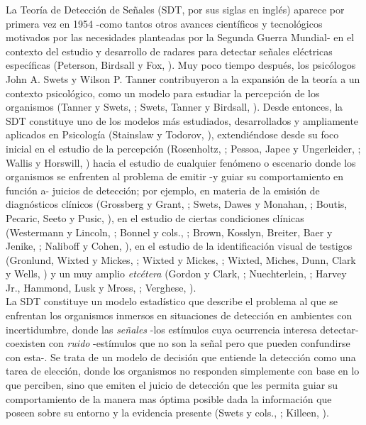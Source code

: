 La Teoría de Detección de Señales (SDT, por sus siglas en inglés) aparece por primera vez en 1954 -como tantos otros avances científicos y tecnológicos motivados por las necesidades planteadas por la Segunda Guerra Mundial- en el contexto del estudio y desarrollo de radares para detectar señales eléctricas específicas (Peterson, Birdsall y Fox, \citeyear{Peterson1954}). Muy poco tiempo después, los psicólogos John A. Swets y Wilson P. Tanner contribuyeron a la expansión de la teoría a un contexto psicológico, como un modelo para estudiar la percepción de los organismos (Tanner y Swets, \citeyear{Tanner1954}; Swets, Tanner y Birdsall, \citeyear{Swets1961}). Desde entonces, la SDT constituye uno de los modelos más estudiados, desarrollados y ampliamente aplicados en Psicología (Stainslaw y Todorov, \citeyear{Stainslaw1999}), extendiéndose desde su foco inicial en el estudio de la percepción (Rosenholtz, \citeyear{Rosenholtz2001}; Pessoa, Japee y Ungerleider, \citeyear{Pessoa2005}; Wallis y Horswill, \citeyear{Wallis2007}) hacia el estudio de cualquier fenómeno o escenario donde los organismos se enfrenten al problema de emitir -y guiar su comportamiento en función a- juicios de detección; por ejemplo, en materia de la emisión de diagnósticos clínicos (Grossberg y Grant, \citeyear{Grossberg1978}; Swets, Dawes y Monahan, \citeyear{Swets2000}; Boutis, Pecaric, Seeto y Pusic, \citeyear{Boutis2010}), en el estudio de ciertas condiciones clínicas (Westermann y Lincoln, \citeyear{Westermann2010}; Bonnel y cols., \citeyear{Bonnel2003}; Brown, Kosslyn, Breiter, Baer y Jenike, \citeyear{Brown1994}; Naliboff y Cohen, \citeyear{Naliboff1981}), en el estudio de la identificación visual de testigos (Gronlund, Wixted y Mickes, \citeyear{Gronlund2014}; Wixted y Mickes, \citeyear{Wixted2014}; Wixted, Miches, Dunn, Clark y Wells, \citeyear{Wixted2016}) y un muy amplio \textit{etcétera} (Gordon y Clark, \citeyear{Gordon1974}; Nuechterlein, \citeyear{Nuechterlein1983}; Harvey Jr., Hammond, Lusk y Mross, \citeyear{Harvey1992}; Verghese, \citeyear{Verghese2001}).\\ 

La SDT constituye un modelo estadístico que describe el problema al que se enfrentan los organismos inmersos en situaciones de detección en ambientes con incertidumbre, donde las \textit{señales} -los estímulos cuya ocurrencia interesa detectar- coexisten con \textit{ruido} -estímulos que no son la señal pero que pueden confundirse con esta-. Se trata de un modelo de decisión que entiende la detección como una tarea de elección, donde los organismos no responden simplemente con base en lo que perciben, sino que emiten el juicio de detección que les permita guiar su comportamiento de la manera mas óptima posible dada la información que poseen sobre su entorno y la evidencia presente (Swets y cols., \citeyear{Swets2000}; Killeen, \citeyear{Killeen2014}).\\

